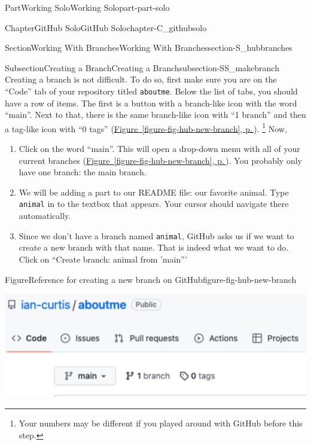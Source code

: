 \documentclass[twoside,10pt,]{book}
\newcommand{\xreffont}{\relax}
\newcommand{\mono}[1]{\texttt{#1}}
\begin{document}
\begin{partptx}{Part}{Working Solo}{}{Working Solo}{}{}{part-part-solo}
\begin{chapterptx}{Chapter}{GitHub Solo}{}{GitHub Solo}{}{}{chapter-C_githubsolo}
\begin{sectionptx}{Section}{Working With Branches}{}{Working With Branches}{}{}{section-S_hubbranches}
\begin{subsectionptx}{Subsection}{Creating a Branch}{}{Creating a Branch}{}{}{subsection-SS_makebranch}
%
%
Creating a branch is not difficult. To do so, first make sure you are on the ``Code'' tab of your repository titled \mono{aboutme}. Below the list of tabs, you should have a row of items. The first is a button with a branch-like icon with the word ``main''. Next to that, there is the same branch-like icon with ``1 branch'' and then a tag-like icon with ``0 tags'' (\hyperref[figure-fig-hub-new-branch]{Figure~{\xreffont\ref{figure-fig-hub-new-branch}}, p.\,\pageref{figure-fig-hub-new-branch}}). \footnote{Your numbers may be different if you played around with GitHub before this step.\label{fn-SS_makebranch-d-g}} Now,%
\begin{enumerate}
\item{}Click on the word ``main''. This will open a drop-down menu with all of your current branches (\hyperref[figure-fig-hub-new-branch]{Figure~{\xreffont\ref{figure-fig-hub-new-branch}}, p.\,\pageref{figure-fig-hub-new-branch}}). You probably only have one branch: the main branch.%
\item{}We will be adding a part to our README file: our favorite animal. Type \mono{animal} in to the textbox that appears. Your cursor should navigate there automatically.%
\item{}Since we don't have a branch named \mono{animal}, GitHub asks us if we want to create a new branch with that name. That is indeed what we want to do. Click on ``Create branch: animal from 'main'''%
\end{enumerate}
%
\begin{figureptx}{Figure}{Reference for creating a new branch on GitHub}{figure-fig-hub-new-branch}{}%
\begin{sidebyside}{2}{0}{0}{0}%
\begin{sbspanel}{0.5}%
\includegraphics[width=\linewidth]{external/hub_new_branch.pdf}
\end{sbspanel}%
\begin{sbspanel}{0.5}%

\end{sbspanel}
\end{sidebyside}
\end{figureptx}
\end{subsectionptx}
\end{sectionptx}
\end{chapterptx}
\end{partptx}
\end{document}

